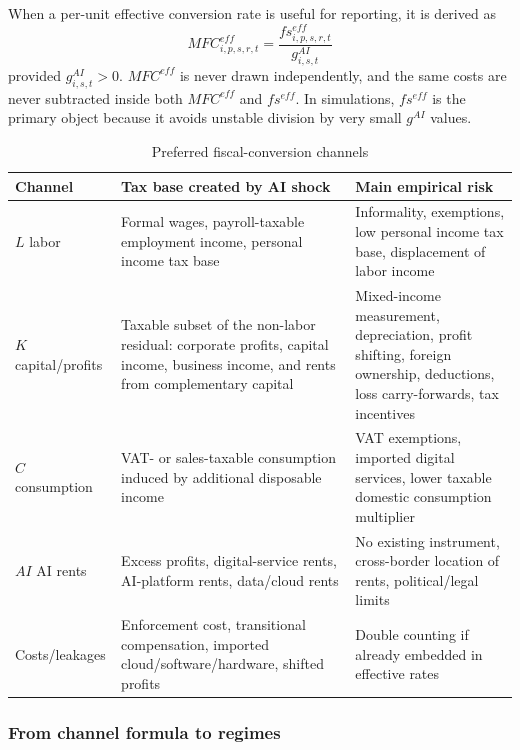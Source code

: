 \documentclass[11pt,a4paper]{article}
\begin{document}
When a per-unit effective conversion rate is useful for reporting, it is derived as
\begin{equation}\label{eq:mfc_eff_v17}
    MFC^{eff}_{i,p,s,r,t}=\frac{fs^{eff}_{i,p,s,r,t}}{g^{AI}_{i,s,t}}
\end{equation}
provided $g^{AI}_{i,s,t}>0$. $MFC^{eff}$ is never drawn independently, and the same costs are never subtracted inside both $MFC^{eff}$ and $fs^{eff}$. In simulations, $fs^{eff}$ is the primary object because it avoids unstable division by very small $g^{AI}$ values.

\begin{table}[H]
\centering
\caption{Preferred fiscal-conversion channels}
\label{tab:preferred_fiscal_channels}
\small
\begin{tabular}{p{}p{}p{}}
\toprule
Channel & Tax base created by AI shock & Main empirical risk \\
\midrule
$L$ labor & Formal wages, payroll-taxable employment income, personal income tax base & Informality, exemptions, low personal income tax base, displacement of labor income \\
$K$ capital/profits & Taxable subset of the non-labor residual: corporate profits, capital income, business income, and rents from complementary capital & Mixed-income measurement, depreciation, profit shifting, foreign ownership, deductions, loss carry-forwards, tax incentives \\
$C$ consumption & VAT- or sales-taxable consumption induced by additional disposable income & VAT exemptions, imported digital services, lower taxable domestic consumption multiplier \\
$AI$ AI rents & Excess profits, digital-service rents, AI-platform rents, data/cloud rents & No existing instrument, cross-border location of rents, political/legal limits \\
Costs/leakages & Enforcement cost, transitional compensation, imported cloud/software/hardware, shifted profits & Double counting if already embedded in effective rates \\
\bottomrule
\end{tabular}
\end{table}

\subsubsection{From channel formula to regimes}
\end{document}
